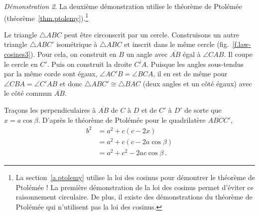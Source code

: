 \noindent \emph{Démonstration 2}.
La deuxième démonstration utilise le théorème de Ptolémée  (théorème~\ref{thm.ptolemy}).\footnote{La section~\ref{a.ptolemy} utilise la loi des cosinus pour démontrer le théorème de Ptolémée ! La première démonstration de la loi des cosinus permet d'éviter ce raisonnement circulaire. De plus, il existe des démonstrations du théorème de Ptolémée qui n'utilisent pas la loi des cosinus.}

Le triangle $\triangle ABC$ peut être circonscrit par un cercle. 
Construisons un autre triangle $\triangle ABC'$ isométrique à $\triangle ABC$ et inscrit dans le même cercle (fig.~\ref{f.law-cosines3}). Pour cela, on construit en $B$ un angle avec $\overline{AB}$ égal à $\angle CAB$. Il coupe le cercle en $C'$. Puis on construit la droite $\overline{C'A}$.
Puisque les angles sous-tendus par la même corde sont égaux, $\angle AC'B =\angle BCA$, il en est de même pour $\angle CBA=\angle C'AB$ et donc $\triangle ABC'\cong \triangle BAC$ (deux angles et un côté égaux) avec le côté commun $\overline{AB}$.

Traçons les perpendiculaires à $\overline{AB}$ de $C$ à $D$ et de $C'$ à $D'$ de sorte que $x=a\cos \beta$. D'après le théorème de Ptolémée pour le quadrilatère $\overline{ABCC'}$,
\begin{align*}
b^2&=a^2+c(c-2x)\\
&= a^2 + c(c-2a\cos\beta)\\
&=a^2+c^2-2ac\cos\beta\,.\tag*{\qed}
\end{align*}


